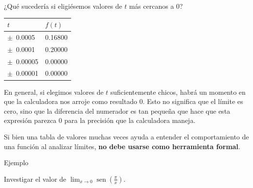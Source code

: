 \documentclass[
  letterpaper,
]{book}
\theoremstyle{plain}
\theoremstyle{remark}
\begin{document}
¿Qué sucedería si eligiésemos valores de \(t\) más cercanos a \(0\)?

\begin{longtable}[]{@{}ll@{}}
\toprule\noalign{}
\(t\) & \(f(t)\) \\
\midrule\noalign{}
\endhead
\bottomrule\noalign{}
\endlastfoot
\(\pm\,\) 0.0005 & 0.16800 \\
\(\pm\,\) 0.0001 & 0.20000 \\
\(\pm\,\) 0.00005 & 0.00000 \\
\(\pm\,\) 0.00001 & 0.00000 \\
\end{longtable}

En general, si elegimos valores de \(t\) suficientemente chicos, habrá
un momento en que la calculadora nos arroje como resultado \(0\). Esto
no significa que el límite es cero, sino que la diferencia del numerador
es tan pequeña que hace que esta expresión parezca \(0\) para la
precisión que la calculadora maneja.

\begin{tcolorbox}[enhanced jigsaw, opacityback=0, left=2mm, opacitybacktitle=0.6, toprule=.15mm, bottomrule=.15mm, colbacktitle=quarto-callout-caution-color!10!white, titlerule=0mm, bottomtitle=1mm, title=\textcolor{quarto-callout-caution-color}{\faFire}\hspace{0.5em}{Importante}, toptitle=1mm, colframe=quarto-callout-caution-color-frame, colback=white, breakable, rightrule=.15mm, arc=.35mm, leftrule=.75mm, coltitle=black]

Si bien una tabla de valores muchas veces ayuda a entender el
comportamiento de una función al analizar límites, \textbf{no debe
usarse como herramienta formal}.

\end{tcolorbox}

Ejemplo

Investigar el valor de
\(\displaystyle \lim_{x\to 0}\operatorname{sen}\left(\frac{\pi}{x}\right)\).
\end{document}
